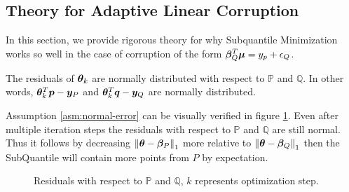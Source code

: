\documentclass{article} %
\newcommand{\norm}[1]{\left\lVert#1\right\rVert}
\begin{document}
\begin{appendices}
	\section{Theory for Adaptive Linear Corruption}
	In this section, we provide rigorous theory for why Subquantile Minimization works so well in the case of corruption of the form $\displaystyle {\bm{\beta}}_Q^T {\bm{\mu}} = y_p + {\epsilon}_Q$.
	\begin{assumption}\label{asm:normal-error}
		The residuals of ${\bm{\theta}}_k$ are normally distributed with respect to $\mathbb{P}$ and $\mathbb{Q}$. In other words, ${\bm{\theta}}_k^T {\bm{p}} - {\bm{y}}_P$ and ${\bm{\theta}}_k^T {\bm{q}} - {\bm{y}}_Q$ are normally distributed.
	\end{assumption}
	Assumption \ref{asm:normal-error} can be visually verified in figure \ref{fig:normal-residual}. Even after multiple iteration steps the residuals with respect to $\mathbb{P}$ and $\mathbb{Q}$ are still normal. Thus it follows by decreasing $\norm{\vtheta - \vbeta_P}_1$ more relative to $\norm{\vtheta - \vbeta_Q}_1$ then the SubQuantile will contain more points from $P$ by expectation. 
	\begin{figure}
		\begin{minipage}[htbp]{0.24\textwidth}
			\centering
			
			\label{fig:1}
		\end{minipage}
		\hfill
		\begin{minipage}[htbp]{0.24\textwidth}
			\centering
			
			\label{fig:2}
		\end{minipage}
		\hfill
		\begin{minipage}[htbp]{0.24\textwidth}
			\centering
			
			\label{fig:3}
		\end{minipage}
		\hfill
		\begin{minipage}[htbp]{0.24\textwidth}
			\centering
			
			\label{fig:4}
		\end{minipage}
		\caption{Residuals with respect to $\mathbb{P}$ and $\mathbb{Q}$, $k$ represents optimization step.}
		\label{fig:normal-residual}
	\end{figure}


\end{appendices}
\end{document}
